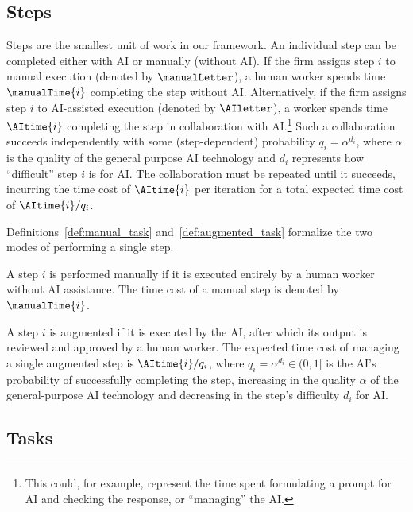\subsection{Steps}
\label{sec:model.steps}

Steps are the smallest unit of work in our framework.
An individual step can be completed either with AI or manually (without AI).
If the firm assigns step $i$ to manual execution (denoted by $\manualLetter$), a human worker spends time $\manualTime{i}$ completing the step without AI.
Alternatively, if the firm assigns step $i$ to AI-assisted execution (denoted by $\AIletter$), a worker spends time $\AItime{i}$ completing the step in collaboration with AI.\footnote{
This could, for example, represent the time spent formulating a prompt for AI and checking the response, or ``managing'' the AI.
}
Such a collaboration succeeds independently with some (step-dependent) probability $q_i=\alpha^{d_i}$, where $\alpha$ is the quality of the general purpose AI technology and $d_i$ represents how ``difficult'' step $i$ is for AI.
The collaboration must be repeated until it succeeds, incurring the time cost of $\AItime{i}$ per iteration for a total expected time cost of $\AItime{i}/q_i$.

Definitions~\ref{def:manual_task} and~\ref{def:augmented_task} formalize the two modes of performing a single step.

\begin{definition}
\label{def:manual_task}
A step $i$ is performed manually if it is executed entirely by a human worker without AI assistance.
The time cost of a manual step is denoted by $\manualTime{i}$.
\end{definition}

\begin{definition}
\label{def:augmented_task}
A step $i$ is augmented if it is executed by the AI, after which its output is reviewed and approved by a human worker.
The expected time cost of managing a single augmented step is $\AItime{i}/q_i$, where $q_i = \alpha^{d_i} \in (0,1]$ is the AI's probability of successfully completing the step, increasing in the quality $\alpha$ of the general-purpose AI technology and decreasing in the step's difficulty $d_i$ for AI.
\end{definition}



\subsection{Tasks}
\label{sec:model.tasks}

